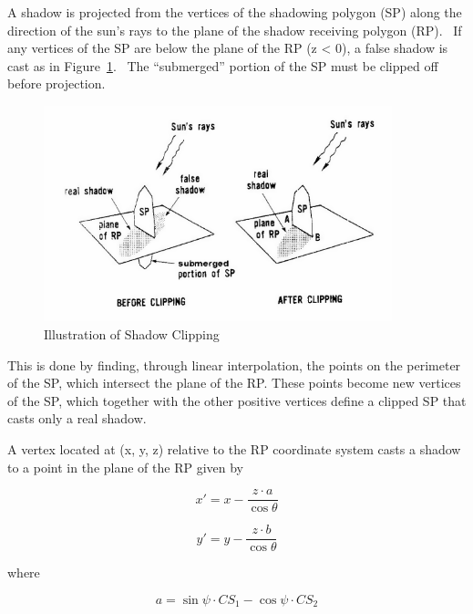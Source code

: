 A shadow is projected from the vertices of the shadowing polygon (SP) along the direction of the sun's rays to the plane of the shadow receiving polygon (RP).~ If any vertices of the SP are below the plane of the RP (z \textless{} 0), a false shadow is cast as in Figure~\ref{fig:illustration-of-shadow-clipping}.~ The ``submerged'' portion of the SP must be clipped off before projection.

\begin{figure}[hbtp] %
\centering
\includegraphics[width=0.9\textwidth, height=0.9\textheight, keepaspectratio=true]{media/image628.png}
\caption{Illustration of Shadow Clipping \protect \label{fig:illustration-of-shadow-clipping}}
\end{figure}

This is done by finding, through linear interpolation, the points on the perimeter of the SP, which intersect the plane of the RP. These points become new vertices of the SP, which together with the other positive vertices define a clipped SP that casts only a real shadow.

A vertex located at (x, y, z) relative to the RP coordinate system casts a shadow to a point in the plane of the RP given by

\begin{equation}
{x'} = x - \frac{{z\cdot a}}{{\cos \theta }}
\end{equation}

\begin{equation}
{y'} = y - \frac{{z\cdot b}}{{\cos \theta }}
\end{equation}

where

\begin{equation}
a = \sin \psi \cdot C{S_1} - \cos \psi \cdot C{S_2}
\end{equation}

